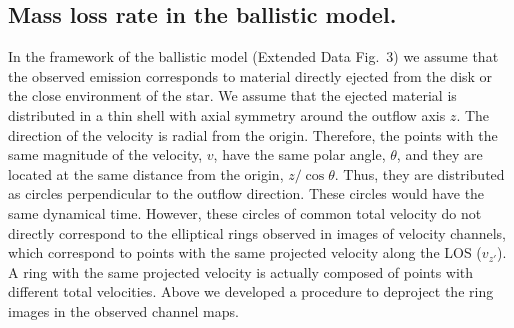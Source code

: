 \documentclass[12pt]{mythesis}
\begin{document}
\subsection{Mass loss rate in the ballistic model.} 

In the framework of the ballistic model (Extended Data Fig.~3) we assume that the observed emission corresponds to material directly ejected from the disk or the close environment of the star. We assume that the ejected material is distributed in a thin shell with axial symmetry around the outflow axis $z$. 
The direction of the velocity is radial from the origin. Therefore, the points with the same magnitude of the velocity, $v$, have the same polar angle, $\theta$, and they are located at the same distance from the origin, $z/\cos\theta$. Thus, they are distributed as circles perpendicular to the outflow direction. These circles would have the same dynamical time. However, these circles of common total velocity do not directly correspond to the elliptical rings observed in images of velocity channels, which correspond to points with the same projected velocity along the LOS ($v_{z'}$). A ring with the same projected velocity is actually composed of points with different total velocities. Above we developed a procedure to deproject the ring images in the observed channel maps.
\end{document}
